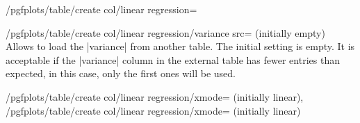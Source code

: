 \begin{stylekey}{/pgfplots/table/create col/linear regression=}
	\begin{key}{/pgfplots/table/create col/linear regression/variance src= (initially empty)}
	Allows to load the |variance| from another table. The initial setting is empty. It is acceptable if the |variance| column in the external table has fewer entries than expected, in this case, only the first ones will be used.
	\end{key}

	\begin{keylist}{%
		/pgfplots/table/create col/linear regression/xmode= (initially linear),
		/pgfplots/table/create col/linear regression/xmode= (initially linear)}
	\end{keylist}
\end{stylekey}


